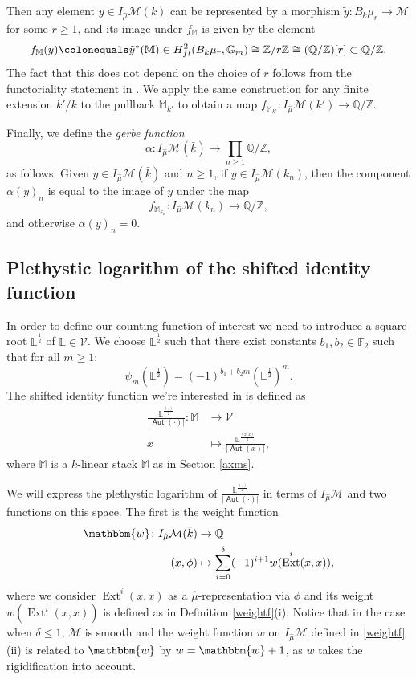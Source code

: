 \documentclass{article}
\DeclareMathOperator{\Aut}{\mathsf{Aut}}
\newcommand{\BF}{{\mathbb{F}}}
\newcommand{\BG}{{\mathbb{G}}}
\newcommand{\BL}{{\mathbb{L}}}
\newcommand{\BM}{{\mathbb{M}}}
\newcommand{\BQ}{{\mathbb{Q}}}
\newcommand{\BZ}{{\mathbb{Z}}}
\newcommand{\Bw}{\mathbbm{w}}
\newcommand{\CM}{{\mathcal M}}
\newcommand{\CV}{{\mathcal V}}
\DeclareMathOperator{\Ext}{Ext}
\newcommand{\defeq}{\colonequals}
\theoremstyle{definition}
\theoremstyle{plain}
\begin{document}
Then any element $y \in I_{\hat\mu}\CM(k)$ can be represented by a morphism $\tilde y\colon B_k \mu_r \to \CM$ for some $r \geq 1$, and its image under $f_\BM$ is given by the element
\begin{equation*}
    f_\BM(y) \defeq \tilde y^*(\BM) \in H^2_{\rm fl}(B_k \mu_r,\BG_m) \cong \BZ/r\BZ \cong (\BQ/\BZ)[r] \subset \BQ/\BZ.
\end{equation*}
The fact that this does not depend on the choice of $r$ follows from the functoriality statement in \cite[Lemma 3.4]{GWZ20b}. We apply the same construction for any finite extension $k'/k$ to the pullback $\BM_{k'}$ to obtain a map $f_{\BM_{k'}}\colon I_{\hat\mu}\CM(k')\to \BQ/\BZ$.


Finally, we define the \textit{gerbe function}
\[ \alpha: I_{\hat{\mu}}\CM(\bar{k}) \rightarrow \prod_{n\geq 1}\BQ/\BZ,\]
as follows: Given $y \in I_{\hat\mu} \CM(\bar k)$ and $n\geq 1$, if $y \in I_{\hat\mu} \CM(k_n)$, then the component $\alpha(y)_n$ is equal to the image of $y$ under the map $$f_{\BM_{k_n}}\colon I_{\hat\mu}\CM(k_n) \to \BQ/\BZ,$$  and otherwise $\alpha(y)_n=0$.




\subsection{Plethystic logarithm of the shifted identity function}\label{pls}

In order to define our counting function of interest we need to introduce a square root $\BL^{\frac{1}{2}}$ of $\BL \in \CV$. We choose $\BL^{\frac{1}{2}}$ such that there exist constants $b_1,b_2 \in \BF_2$ such that for all $m \geq 1$:
\begin{equation*}
    \psi_m(\BL^{\frac{1}{2}})=(-1)^{b_1+b_2m}(\BL^{\frac{1}{2}})^m.
\end{equation*}
The shifted identity function we're interested in is defined as
\begin{align} \label{shid} \frac{\BL^{\frac{(,)}{2}}}{|\Aut(\cdot)|}\colon \BM &\rightarrow \CV \\
x &\mapsto \frac{\BL^{\frac{(x,x)}{2}}}{|\Aut(x)|}, \nonumber   
\end{align}
where $\BM$ is a $k$-linear stack $\BM$ as in Section \ref{axms}. 


We will express the plethystic logarithm of $ \frac{\BL^{\frac{(,)}{2}}}{|\Aut(\cdot)|}$ in terms of $I_{\hat{\mu}}\CM$ and two functions on this space. The first is the weight function 
\begin{align*}\Bw\colon I_{\hat{\mu}}\CM(\bar{k}) &\rightarrow \BQ \\
(x,\phi) &\mapsto \sum_{i=0}^\delta (-1)^{i+1} w(\Ext^i(x,x)),
\end{align*}
where we consider $\Ext^i(x,x)$ as a $\hat{\mu}$-representation via $\phi$ and its weight $w(\Ext^i(x,x))$ is defined as in Definition \ref{weightf}(i). Notice that in the case when $\delta \leq 1$, $\CM$ is smooth and the weight function $w$ on $I_{\hat{\mu}}\CM$ defined in \ref{weightf}(ii) is related to $\Bw$ by $w = \Bw +1$, as $w$ takes the rigidification into account. 
\end{document}
